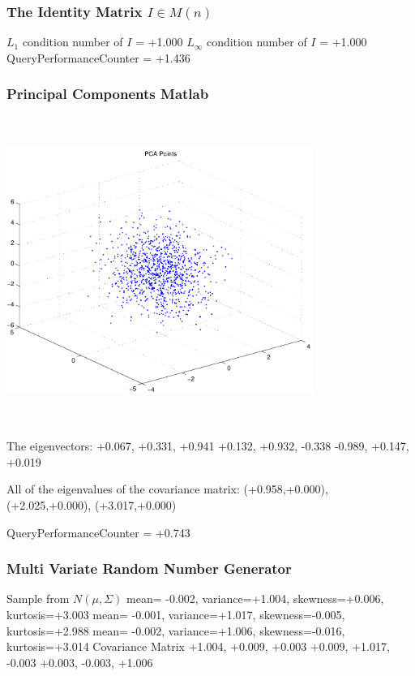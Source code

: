 \documentclass[9pt]{article}
\theoremstyle{plain}
\theoremstyle{definition}
\theoremstyle{remark}
\numberwithin{equation}{section}
\begin{document}
\subsubsection{The Identity Matrix $I \in M(n)$}
$L_1$ condition number of $I$ = +1.000
$L_\infty$ condition number of $I$ = +1.000
QueryPerformanceCounter  =  +1.436
\subsubsection{Principal Components Matlab }
\includegraphics[width=10.0cm,height=10.0cm]{PCAPoints.pdf}

The eigenvectors:
+0.067, +0.331, +0.941
+0.132, +0.932, -0.338
-0.989, +0.147, +0.019

All of the eigenvalues of the covariance matrix:
(+0.958,+0.000), (+2.025,+0.000), (+3.017,+0.000)

QueryPerformanceCounter  =  +0.743
\subsubsection{Multi Variate Random Number Generator }
Sample from $N(\mu,\Sigma)$
mean= -0.002, variance=+1.004, skewness=+0.006, kurtosis=+3.003
mean= -0.001, variance=+1.017, skewness=-0.005, kurtosis=+2.988
mean= -0.002, variance=+1.006, skewness=-0.016, kurtosis=+3.014
Covariance Matrix 
+1.004, +0.009, +0.003
+0.009, +1.017, -0.003
+0.003, -0.003, +1.006
\end{document}
